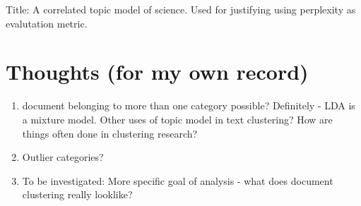 \documentclass{article}
\begin{document}
\cite{blei2007correlated}
Title: A correlated topic model of science. Used for justifying using perplexity as evalutation metric.


\section{Thoughts (for my own record)}

\begin{enumerate}
  \item document belonging to more than one category possible? Definitely - LDA is a mixture model. Other uses of topic model in text clustering? How are things often done in clustering research? 
  \item Outlier categories?
  \item To be investigated: More specific goal of analysis - what does document clustering really looklike?
\end{enumerate}




\end{document}
